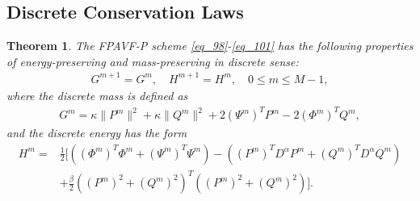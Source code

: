 \documentclass[preprint,compress,3p,10pt,fleqn]{elsarticle}
\numberwithin{equation}{section}
\newtheorem{theorem}{Theorem}[section]
\begin{document}
\subsection{Discrete Conservation Laws}
\begin{theorem}\label{thm4}
The FPAVF-P scheme \eqref{eq_98}-\eqref{eq_101} has the following properties of energy-preserving and mass-preserving in discrete sense:
\begin{align}\label{eq_11141}
G^{m+1}=G^{m}, \quad H^{m+1}=H^{m}, \quad 0 \leq m \leq M-1,
\end{align}
where the discrete mass is defined as
\begin{align}\label{eq_11142}
G^{m}=\kappa\|P^{m}\|^2+\kappa\|Q^{m}\|^2+2 \left(\Psi^{m}\right)^T P^{m}-2 \left(\varPhi^{m}\right)^T Q^{m},
\end{align}
and the discrete energy has the form
\begin{align}
H^{m}=&\frac{1}{2}[((\varPhi^{m})^{T}\varPhi^{m}+(\Psi^{m})^{T}\Psi^{m})-((P^{m})^{T} D^{\alpha} P^{m}+(Q^{m})^{T} D^{\alpha} Q^{m})\nonumber\\
&+\frac{\beta}{2}((P^{m})^2+(Q^{m})^2)^{T}((P^{m})^2+(Q^{m})^2)].\label{eq_800}
\end{align}
\end{theorem}
\end{document}
